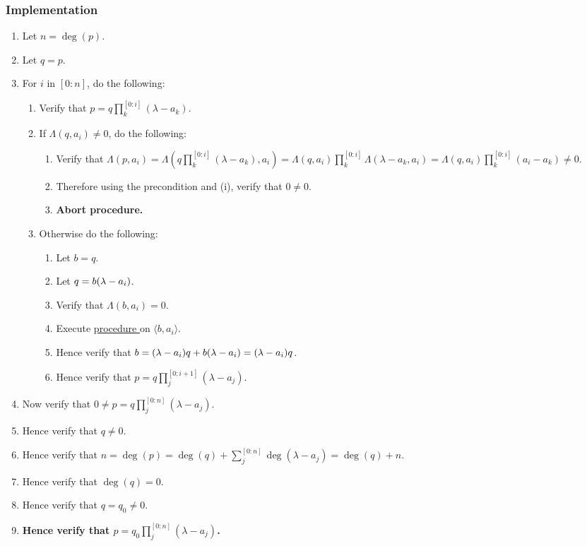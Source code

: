\documentclass{article}
\let\div\relax\DeclareMathOperator{\div}{div}
\let\mod\relax\DeclareMathOperator{\mod}{mod}
\newcounter{procedure}[part]
\newcommand{\implementation}{\subsubsection*{Implementation}}
\newcommand{\procedurehr}[1]{\hyperref[sec:procedure #1]{procedure \expandafter\csname procedure#1\endcsname}}
\begin{document}
\begin{multicols}{2}
			\implementation
				\begin{enumerate}
					\item Let $n=\deg(p)$.
					\item Let $q=p$.
					\item For $i$ in $[0:n]$, do the following:
					\begin{enumerate}
						\item Verify that $p=q\prod_k^{[0:i]}(\lambda-a_k)$.
						\item If $\Lambda(q,a_i)\ne 0$, do the following:
						\begin{enumerate}
							\item Verify that $\Lambda(p,a_i)=\Lambda(q\prod_k^{[0:i]}(\lambda-a_k),a_i)=\Lambda(q,a_i)\prod_k^{[0:i]}\Lambda(\lambda-a_k,a_i)=\Lambda(q,a_i)\prod_k^{[0:i]}(a_i-a_k)\ne 0$.
							\item Therefore using the precondition and (i), verify that $0\ne 0$.
							\item \textbf{Abort procedure.}
						\end{enumerate}
						\item Otherwise do the following:
						\begin{enumerate}
							\item Let $b=q$.
							\item Let $q=b\div(\lambda-a_i)$.
							\item Verify that $\Lambda(b,a_i)=0$.
							\item Execute \procedurehr{2.79} on $\langle b,a_i\rangle$.
							\item Hence verify that $b=(\lambda-a_i)q+b\mod(\lambda-a_i)=(\lambda-a_i)q$.
							\item Hence verify that $p=q\prod_j^{[0:{i+1}]}(\lambda-a_j)$.
						\end{enumerate}
					\end{enumerate}
					\item Now verify that $0\ne p=q\prod_j^{[0:{n}]}(\lambda-a_j)$.
					\item Hence verify that $q\ne 0$.
					\item Hence verify that $n=\deg(p)=\deg(q)+\sum_j^{[0:n]}\deg(\lambda-a_j)=\deg(q)+n$.
					\item Hence verify that $\deg(q)=0$.
					\item Hence verify that $q=q_0\ne 0$.
					\item \textbf{Hence verify that $p=q_0\prod_j^{[0:{n}]}(\lambda-a_j)$.}
				\end{enumerate}

\end{multicols}
\end{document}
